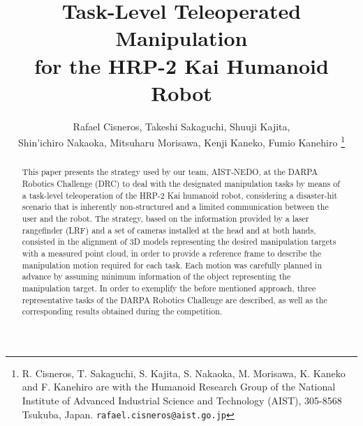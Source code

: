 \documentclass[letterpaper, 10 pt, conference]{ieeeconf}
\begin{document}
	\title{\LARGE \bf Task-Level Teleoperated Manipulation \\ for the HRP-2 Kai Humanoid Robot}

	\author{Rafael Cisneros, Takeshi Sakaguchi, Shuuji Kajita, \\
					Shin'ichiro Nakaoka, Mitsuharu Morisawa, Kenji Kaneko, Fumio Kanehiro
	\thanks{R. Cisneros, T. Sakaguchi, S. Kajita, S. Nakaoka, M. Morisawa, K. Kaneko and F. Kanehiro
					are with the Humanoid Research Group of the National Institute of Advanced Industrial Science
					and Technology (AIST), 305-8568 Tsukuba, Japan. {\tt\small rafael.cisneros@aist.go.jp}}}
  
	\maketitle

	\thispagestyle{empty}
	\pagestyle{empty}

	\begin{abstract}
		This paper presents the strategy used by our team, AIST-NEDO, at the DARPA Robotics Challenge (DRC) to deal
		with the designated manipulation tasks by means of a task-level teleoperation of the HRP-2 Kai humanoid robot,
		considering a disaster-hit scenario that is inherently non-structured and a limited communication between the
		user and the robot.
		The strategy, based on the information provided by a laser rangefinder (LRF) and a set of cameras installed
		at the head and at both hands, consisted in the alignment of 3D models representing the desired manipulation
		targets with a measured point cloud, in order to provide a reference frame to describe the manipulation motion
		required for each task.
		Each motion was carefully planned in advance by assuming minimum information of the object representing the
		manipulation target.
		In order to exemplify the before mentioned approach, three representative tasks of the DARPA Robotics Challenge
		are described, as well as the corresponding results obtained during the competition.
	\end{abstract}

	
	
		
	
	
	
	
		
	
		
	

	
		
	
	
	
	
	
	
	
\end{document}
